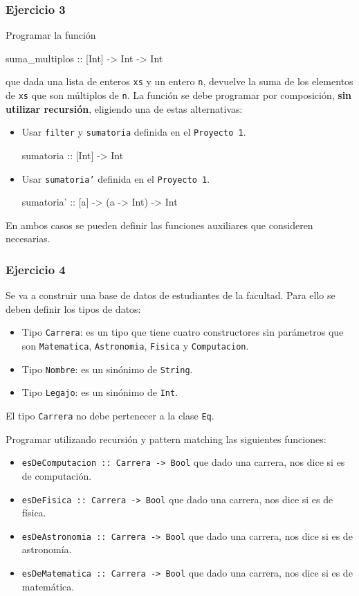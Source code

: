 \documentclass{article}
\begin{document}
\subsubsection{Ejercicio 3}
Programar la función
\begin{haskell}
    suma_multiplos :: [Int] -> Int -> Int
\end{haskell}
que dada una lista de enteros \texttt{xs} y un entero \texttt{n}, devuelve la suma de los elementos de \texttt{xs} que son múltiplos de \texttt{n}.
La función se debe programar por composición, \textbf{sin utilizar recursión}, eligiendo una de estas alternativas:
\begin{itemize}
    \item Usar \texttt{filter} y \texttt{sumatoria} definida en el \texttt{Proyecto 1}.
    \begin{haskell}
        sumatoria :: [Int] -> Int
    \end{haskell}
    \item Usar \texttt{sumatoria'} definida en el \texttt{Proyecto 1}.
    \begin{haskell}
        sumatoria' :: [a] -> (a -> Int) -> Int
    \end{haskell}
\end{itemize}
En ambos casos se pueden definir las funciones auxiliares que consideren necesarias.

\subsubsection{Ejercicio 4}
Se va a construir una base de datos de estudiantes de la facultad. Para ello se deben definir los tipos de datos:
\begin{itemize}
    \item Tipo \texttt{Carrera}: es un tipo que tiene cuatro constructores sin parámetros que son \texttt{Matematica}, \texttt{Astronomia}, \texttt{Fisica} y \texttt{Computacion}.
    \item Tipo \texttt{Nombre}: es un sinónimo de \texttt{String}.
    \item Tipo \texttt{Legajo}: es un sinónimo de \texttt{Int}.
\end{itemize}
\begin{note}
    El tipo \texttt{Carrera} no debe pertenecer a la clase \texttt{Eq}.
\end{note}

Programar utilizando recursión y pattern matching las siguientes funciones:
\begin{itemize}
    \item \texttt{esDeComputacion :: Carrera -> Bool} que dado una carrera, nos dice si es de computación.
    \item \texttt{esDeFisica :: Carrera -> Bool} que dado una carrera, nos dice si es de física.
    \item \texttt{esDeAstronomia :: Carrera -> Bool} que dado una carrera, nos dice si es de astronomía.
    \item \texttt{esDeMatematica :: Carrera -> Bool} que dado una carrera, nos dice si es de matemática.
\end{itemize}
\end{document}
